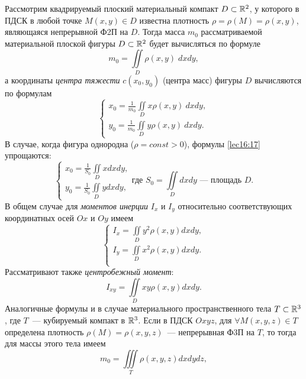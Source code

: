 \documentclass[../../main.tex]{subfiles}
\begin{document}
Рассмотрим квадрируемый плоский материальный компакт
$D \subset \mathbb{R}^{2}$, у которого в ПДСК в любой точке $M(x, y) \in D$ известна
плотность $\rho = \rho(M) = \rho(x,y)$, являющаяся непрерывной Ф2П на $D$. 
Тогда
масса $m_0$ рассматриваемой материальной плоской фигуры $D \subset \mathbb{R}^{2}$
будет вычисляться по формуле
\begin{equation}
\label{lec16:15}
m_0 = \iint\limits_D \rho(x, y) \; dxdy,
\end{equation}
а координаты \emph{центра тяжести} $c(x_0, y_0)$ (центра масс)
фигуры $D$ вычисляются по формулам
\begin{equation}
\label{lec16:16}
\begin{cases}
	x_0 = \frac{1}{m_0}\iint\limits_D x\rho(x,y)\: dx dy,\\
	y_0 = \frac{1}{m_0}\iint\limits_D y\rho(x,y)\: dx dy.
	\end{cases}
\end{equation}
В случае, когда фигура однородна ($\rho=const>0$),
 формулы \ref{lec16:17} упрощаются:
 \begin{equation*}
 \begin{cases}
 	x_0 = \frac{1}{S_0}\iint\limits_D x dx dy,\\
 	y_0 =\frac{1}{S_0}\iint\limits_D y dx dy,
 	\end{cases}
 \text{где } S_0=\iint\limits_D dxdy\text{~--- площадь }D.
 \end{equation*}
В общем случае для \emph{моментов инерции} $I_x$ и $I_y$ относительно 
соответствующих 
координатных
осей $Ox$ и $Oy$ имеем
\begin{equation}
\label{lec16:17}
\begin{cases}
	I_x = \iint\limits_Dy^2\rho(x, y) dx dy,\\
	I_y = \iint\limits_Dx^2\rho(x, y) dx dy.\\
	\end{cases}
\end{equation}
Рассматривают также \emph{центробежный момент}:
\begin{equation}
\label{lec16:18}
I_{xy} = \iint\limits_Dxy\rho(x, y) dx dy.
\end{equation}
Аналогичные формулы и в случае материального пространственного тела
$T \subset \mathbb{R}^{3}$, где $T$~--- кубируемый компакт в $\mathbb{R}^{3}$.
Если в ПДСК $Oxyz$, для $\forall M(x, y, z) \in T$ определена плотность $\rho 
(M) =
\rho(x, y, z)$~--- непрерывная Ф3П на $T$, то тогда для массы этого тела имеем
\begin{equation}
\label{lec16:19}
m_0 = \iiint\limits_T \rho(x, y, z) dx dy dz,
\end{equation}
\end{document}
